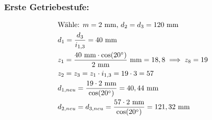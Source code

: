 \subsubsection{Erste Getriebestufe:}
\begin{align*}
	&\text{Wähle: } m= 2\text{ mm, } d_2 = d_3 = 120 \text{ mm} \\
	&d_1 = \frac{d_3}{i_{1,3}} = 40 \text{ mm} \\
	&z_1 = \frac{40 \text{ mm} \cdot \cos(20^\circ)}{2 \text{ mm}} \text{ mm} = 18,8 \implies z_8 = 19\\
	&z_2=z_3 = z_1 \cdot i_{1,3} =19 \cdot 3 = 57 \\
	&d_{1,neu} = \frac{19 \cdot 2 \text{ mm}}{\cos(20^\circ)} = 40,44 \text{ mm} \\
	&d_{2,neu} = d_{3,neu} = \frac{57 \cdot 2 \text{ mm}}{\cos(20^\circ)} = 121,32 \text{ mm} \\
\end{align*}
